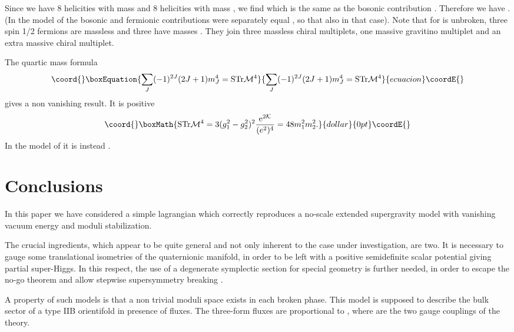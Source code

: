 \documentclass[a4paper,12pt]{article}
\begin{document}
Since we have 8 helicities with mass \coordHE{} and 8 helicities with mass \coordHE{}, we find
\coordHE{}
which is the same as the bosonic contribution \coordHE{}.
Therefore we have \coordHE{}.
(In the model of \cite{cgp2} the bosonic and fermionic contributions were separately equal \coordHE{},
 so that \coordHE{} also in that case).
Note that for \coordHE{}  \coordHE{} is unbroken, three spin 1/2 fermions  are massless and three have masses \coordHE{}.
They join three massless chiral multiplets, one massive gravitino multiplet and an extra massive chiral multiplet.

The quartic mass formula
\begin{equation}\coord{}\boxEquation{
 \sum_J (-1)^{2J} (2J+1)m_J^4 = {\rm STr} {\mathcal M}^4
}{
 \sum_J (-1)^{2J} (2J+1)m_J^4 = {\rm STr} {\mathcal M}^4
}{ecuacion}\coordE{}\end{equation}
gives a non vanishing result. It is positive 
$$\coord{}\boxMath{{\rm STr} {\mathcal M}^4= 3 (g_1^2-g_2^2)^2\frac{{\rm e}^{2{\mathcal K}}}{(e^2)^4}= 48m_1^2m_2^2.
}{dollar}{0pt}\coordE{}$$
In the model of \cite{cgp2} it is instead \coordHE{}.

\section{Conclusions}
In this paper we have considered a simple \coordHE{} lagrangian which correctly reproduces a no-scale extended
supergravity model with vanishing vacuum energy and moduli stabilization.

The crucial ingredients, which appear to be quite general and not only inherent to the case under investigation, are two.
It is necessary to gauge some translational isometries of the quaternionic manifold, in order to be left with a positive semidefinite 
scalar potential giving partial super-Higgs. In this respect,
the use of a degenerate symplectic section for special geometry is further needed, in order to escape the no-go theorem and allow stepwise
supersymmetry breaking \coordHE{}.

A property of such models is that a non trivial moduli space exists in each broken phase.
This model is supposed to describe the bulk sector of a type IIB orientifold in presence of fluxes.
The three-form fluxes are proportional to \coordHE{}, where \coordHE{} are the two gauge couplings of the theory.
\end{document}
